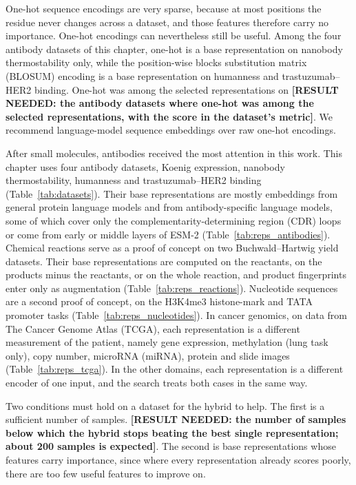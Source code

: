One-hot sequence encodings are very sparse, because at most positions the residue never changes across a dataset, and those features therefore carry no importance. One-hot encodings can nevertheless still be useful. Among the four antibody datasets of this chapter, one-hot is a base representation on nanobody thermostability only, while the position-wise blocks substitution matrix (BLOSUM) encoding is a base representation on humanness and trastuzumab--HER2 binding. One-hot was among the selected representations on \textbf{[RESULT NEEDED: the antibody datasets where one-hot was among the selected representations, with the score in the dataset's metric]}. We recommend language-model sequence embeddings over raw one-hot encodings.

After small molecules, antibodies received the most attention in this work. This chapter uses four antibody datasets, Koenig expression, nanobody thermostability, humanness and trastuzumab--HER2 binding (Table~\ref{tab:datasets}). Their base representations are mostly embeddings from general protein language models and from antibody-specific language models, some of which cover only the complementarity-determining region (CDR) loops or come from early or middle layers of ESM-2 (Table~\ref{tab:reps_antibodies}). Chemical reactions serve as a proof of concept on two Buchwald--Hartwig yield datasets. Their base representations are computed on the reactants, on the products minus the reactants, or on the whole reaction, and product fingerprints enter only as augmentation (Table~\ref{tab:reps_reactions}). Nucleotide sequences are a second proof of concept, on the H3K4me3 histone-mark and TATA promoter tasks (Table~\ref{tab:reps_nucleotides}). In cancer genomics, on data from The Cancer Genome Atlas (TCGA), each representation is a different measurement of the patient, namely gene expression, methylation (lung task only), copy number, microRNA (miRNA), protein and slide images (Table~\ref{tab:reps_tcga}). In the other domains, each representation is a different encoder of one input, and the search treats both cases in the same way.

Two conditions must hold on a dataset for the hybrid to help. The first is a sufficient number of samples. \textbf{[RESULT NEEDED: the number of samples below which the hybrid stops beating the best single representation; about 200 samples is expected]}. The second is base representations whose features carry importance, since where every representation already scores poorly, there are too few useful features to improve on.


